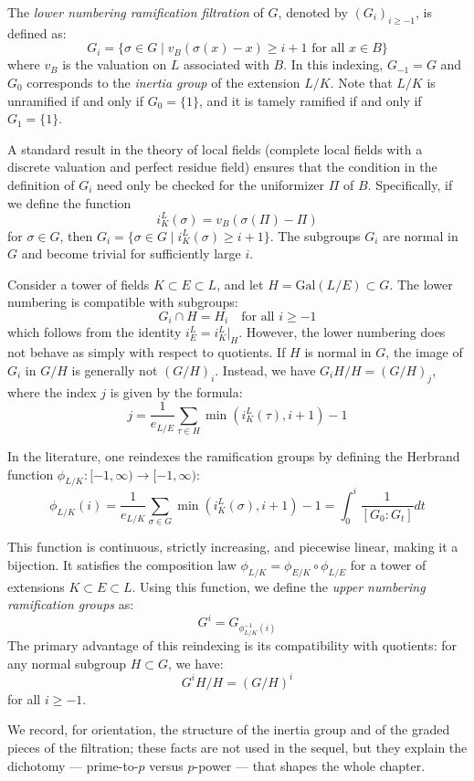 The \textit{lower numbering ramification filtration} of $G$, denoted by $(G_i)_{i \geq -1}$, is defined as:
\[
G_i = \{ \sigma \in G \mid v_B(\sigma (x) - x) \geq i + 1 \text{ for all } x \in B \}
\]
where $v_B$ is the valuation on $L$ associated with $B$. In this indexing, $G_{-1} = G$ and $G_0$
corresponds to the \textit{inertia group} of the extension $L/K$. Note that $L/K$ is unramified if and only if
$G_0 = \{1\}$, and it is tamely ramified if and only if $G_1 = \{1\}$.

A standard result in the theory of local fields (complete local fields with a discrete valuation and perfect residue field)
ensures that the condition in the definition of $G_i$ need only be checked for the uniformizer $\Pi$ of $B$.
Specifically, if we define the function
\[
i^L_K(\sigma) = v_B(\sigma(\Pi) - \Pi)
\]
for $\sigma \in G$, then $G_i = \{ \sigma \in G \mid i^L_K(\sigma) \geq i + 1 \}$.
The subgroups $G_i$ are normal in $G$ and become trivial for sufficiently large $i$.

Consider a tower of fields $K \subset E \subset L$, and let $H = \text{Gal}(L/E) \subset G$. The lower numbering is compatible with subgroups:
\[
G_i \cap H = H_i \quad \text{for all } i \geq -1
\]
which follows from the identity $i^L_E = i^L_K|_{H}$.
However, the lower numbering does not behave as simply with respect to quotients. If $H$ is normal in $G$, the image of $G_i$ in $G/H$ is generally not $(G/H)_i$.
Instead, we have $G_i H / H = (G/H)_j$, where the index $j$ is given by the formula:
\[
j = \frac{1}{e_{L/E}} \sum_{\tau \in H} \min(i^L_K(\tau), i+1) - 1
\]


In the literature, one reindexes the ramification groups by defining the Herbrand function $\phi_{L/K} : [-1, \infty ) \to [-1, \infty )$:
\[ \phi_{L/K}(i) = \frac{1}{e_{L/K}}\sum_{\sigma \in G} \min(i^L_K(\sigma), i+1)-1 = \int _0^i \frac{1}{[G_0 : G_t]} dt \]

This function is continuous, strictly increasing, and piecewise linear, making it a bijection.
It satisfies the composition law $\phi_{L/K} = \phi_{E/K} \circ \phi_{L/E}$ for a tower of extensions $K \subset E \subset L$.
Using this function, we define the \textit{upper numbering ramification groups} as:
\[
G^i = G_{\phi_{L/K}^{-1}(i)}
\]
The primary advantage of this reindexing is its compatibility with quotients: for any normal subgroup $H \subset G$, we have:
\[
G^i H / H = (G/H)^i
\]
for all $i \geq -1$.

We record, for orientation, the structure of the inertia group and of the
graded pieces of the filtration; these facts are not used in the sequel, but
they explain the dichotomy --- prime-to-$p$ versus $p$-power --- that shapes
the whole chapter.

